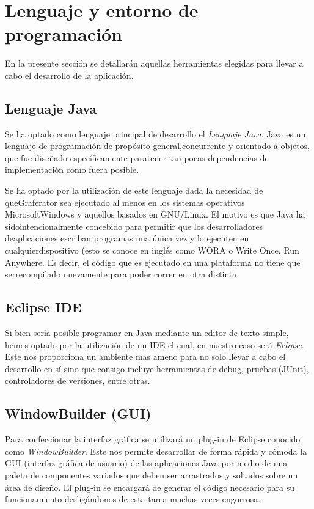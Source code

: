 \documentclass{book}
\begin{document}
\section{Lenguaje y entorno de programación}

En la presente sección se detallarán aquellas herramientas elegidas para llevar a cabo el desarrollo de la aplicación. 
\bigskip


\subsection{Lenguaje Java}

Se ha optado como lenguaje principal de desarrollo el \textit{Lenguaje Java}. Java es un lenguaje de programación de propósito general,concurrente y orientado a objetos, que fue diseñado específicamente paratener tan pocas dependencias de implementación como fuera posible.
\par
Se ha optado por la utilización de este lenguaje dada la necesidad de queGraferator sea ejecutado al menos en los sistemas operativos MicrosoftWindows y aquellos basados en GNU/Linux. El motivo es que Java ha sidointencionalmente concebido para permitir que los desarrolladores deaplicaciones escriban programas una única vez y lo ejecuten en cualquierdispositivo (esto se conoce en inglés como WORA o Write Once, Run Anywhere. Es decir, el código que es ejecutado en una plataforma no tiene que serrecompilado nuevamente para poder correr en otra distinta.
\medskip


\subsection{Eclipse IDE}

Si bien sería posible programar en Java mediante un editor de texto simple, hemos optado por la utilización de un IDE el cual, en nuestro caso será \textit{Eclipse}. Este nos proporciona un ambiente mas ameno para no solo llevar a cabo el desarrollo en sí sino que consigo incluye herramientas de debug, pruebas (JUnit), controladores de versiones, entre otras.
\medskip


\subsection{WindowBuilder (GUI)}

Para confeccionar la interfaz gráfica se utilizará un plug-in de Eclipse conocido como \textit{WindowBuilder}. Este nos permite desarrollar de forma rápida y cómoda la GUI (interfaz gráfica de usuario) de las aplicaciones Java por medio de una paleta de componentes variados que deben ser arrastrados y soltados sobre un área de diseño. El plug-in se encargará de generar el código necesario para su funcionamiento desligándonos de esta tarea muchas veces engorrosa.
\medskip
\end{document}
